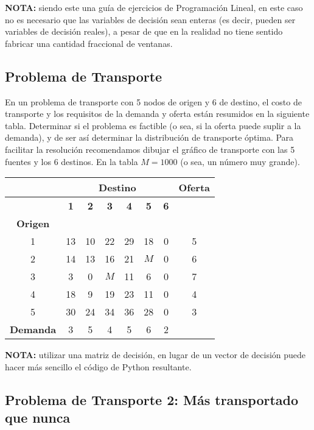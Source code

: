 \documentclass[12pt]{article}
\begin{document}
\vspace{0.3em}

\textbf{NOTA:} siendo este una guía de ejercicios de Programación Lineal, en este caso no es necesario que las variables de decisión sean enteras (es decir, pueden ser variables de decisión reales), a pesar de que en la realidad no tiene sentido fabricar una cantidad fraccional de ventanas.

\subsection{Problema de Transporte}

En un problema de transporte con 5 nodos de origen y 6 de destino, el costo de transporte y los requisitos de la demanda y oferta están resumidos en la siguiente tabla. Determinar si el problema es factible (o sea, si la oferta puede suplir a la demanda), y de ser así determinar la distribución de transporte óptima. Para facilitar la resolución recomendamos dibujar el gráfico de transporte con las 5 fuentes y los 6 destinos. En la tabla \(M = 1000\) (o sea, un número muy grande).

\begin{center}
\begin{tabular}{c|cccccc|c}
\hline
& \multicolumn{6}{c|}{\textbf{Destino}} & \textbf{Oferta} \\
\hline
& \textbf{1} & \textbf{2} & \textbf{3} & \textbf{4} & \textbf{5} & \textbf{6} &  \\
\hline
\textbf{Origen} & & & & & & & \\
1 & 13 & 10 & 22 & 29 & 18 & 0 & 5 \\
2 & 14 & 13 & 16 & 21 & $M$ & 0 & 6 \\
3 & 3 & 0 & $M$ & 11 & 6 & 0 & 7 \\
4 & 18 & 9 & 19 & 23 & 11 & 0 & 4 \\
5 & 30 & 24 & 34 & 36 & 28 & 0 & 3 \\
\hline
\textbf{Demanda} & 3 & 5 & 4 & 5 & 6 & 2 & \\
\hline
\end{tabular}
\end{center}

\textbf{NOTA:} utilizar una matriz de decisión, en lugar de un vector de decisión puede hacer más sencillo el código de Python resultante.

\subsection{Problema de Transporte 2: Más transportado que nunca}
\end{document}
